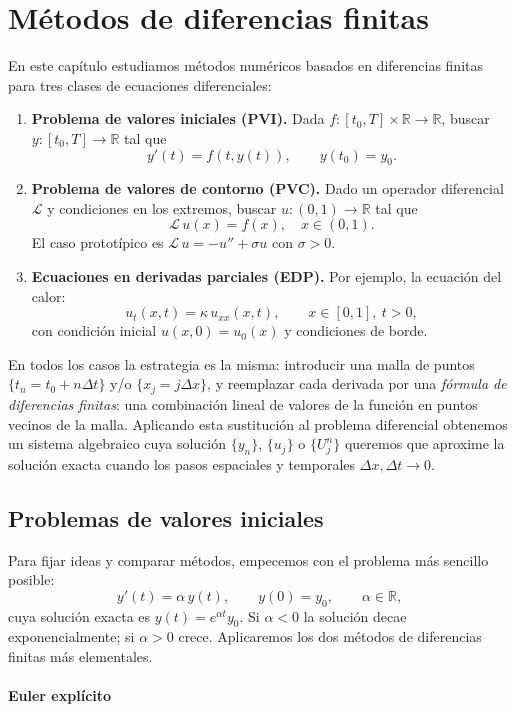 \documentclass[a4paper,11pt]{report}
\begin{document}
\chapter{Métodos de diferencias finitas}

En este capítulo estudiamos métodos numéricos basados en diferencias finitas para tres clases de ecuaciones diferenciales:

\begin{enumerate}
\item \textbf{Problema de valores iniciales (PVI).} Dada $f:[t_0,T]\times\mathbb R\to\mathbb R$, buscar $y:[t_0,T]\to\mathbb R$ tal que
\[
  y'(t)=f(t,y(t)),\qquad y(t_0)=y_0.
\]
\item \textbf{Problema de valores de contorno (PVC).} Dado un operador diferencial $\mathcal L$ y condiciones en los extremos, buscar $u:(0,1)\to\mathbb R$ tal que
\[
  \mathcal L\,u(x)=f(x),\quad x\in(0,1).
\]
El caso prototípico es $\mathcal L\,u=-u''+\sigma u$ con $\sigma>0$.
\item \textbf{Ecuaciones en derivadas parciales (EDP).} Por ejemplo, la ecuación del calor:
\[
  u_t(x,t)=\kappa\,u_{xx}(x,t),\qquad x\in[0,1],\ t>0,
\]
con condición inicial $u(x,0)=u_0(x)$ y condiciones de borde.
\end{enumerate}

En todos los casos la estrategia es la misma: introducir una malla de puntos $\{t_n=t_0+n \Delta t\}$ y/o $\{x_j=j \Delta x\}$, y reemplazar cada derivada por una \emph{fórmula de diferencias finitas}: una combinación lineal de valores de la función en puntos vecinos de la malla. Aplicando esta sustitución al problema diferencial obtenemos un sistema algebraico cuya solución $\{y_n\}$, $\{u_j\}$ o $\{U_j^n\}$ queremos que aproxime la solución exacta cuando los pasos espaciales y temporales $\Delta x, \Delta t \to 0$.

\section{Problemas de valores iniciales}\label{sec:ecuacion_test_new}

Para fijar ideas y comparar métodos, empecemos con el problema más sencillo posible:
\[
  y'(t)=\alpha\,y(t),\qquad y(0)=y_0,\qquad\alpha\in\mathbb R,
\]
cuya solución exacta es $y(t)=e^{\alpha t}y_0$. Si $\alpha<0$ la solución decae exponencialmente; si $\alpha>0$ crece. Aplicaremos los dos métodos de diferencias finitas más elementales.

\subsubsection*{Euler explícito}
\end{document}
